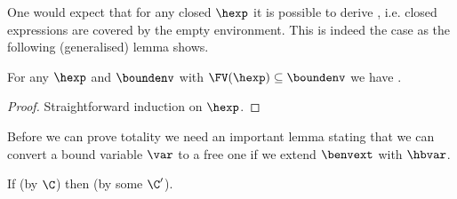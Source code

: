 One would expect that for any closed $\hexp$ it is possible to derive \cover{\emptyset}{\envnil}{\hexp}, i.e. closed expressions are covered by the empty environment.
This is indeed the case as the following (generalised) lemma shows.

\begin{lemma}
\label{lem:empty-cover}
For any $\hexp$ and $\boundenv$ with $\FV(\hexp) \subseteq \boundenv$ we have \cover{\boundenv}{\envnil}{\hexp}.
\end{lemma}


\begin{proof}
Straightforward induction on $\hexp$.
\end{proof}

Before we can prove totality we need an important lemma stating that we can convert a bound variable $\var$ to a free one if we extend $\benvext$ with $\hbvar$.

\begin{lemma}
\label{lem:bound-to-free}
If \cover{\boundenv \cup \set{\var}}{\benvext}{\hexp} (by $\C$) then \cover{\boundenv}{\benvext \envcons \hbvar}{\hexp} (by some $\C'$).
\end{lemma}


